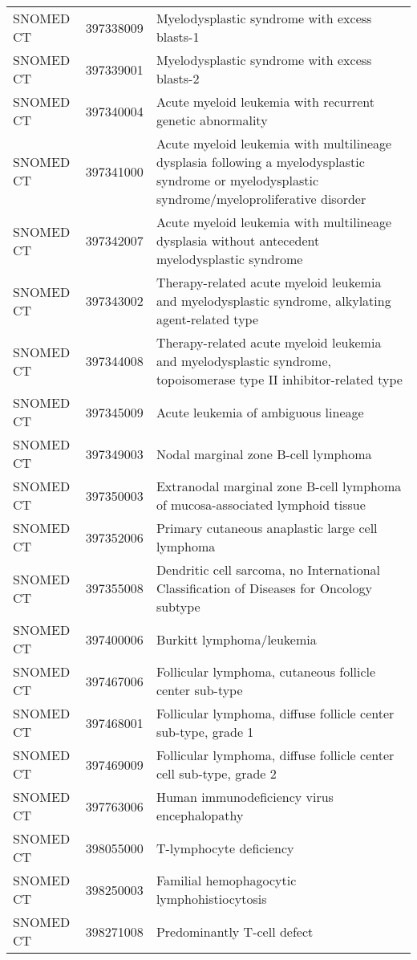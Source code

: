 \begin{table}[ht]
\begin{tabular}{lll}
  SNOMED CT & 397338009 & Myelodysplastic syndrome with excess blasts-1 \\ 
  SNOMED CT & 397339001 & Myelodysplastic syndrome with excess blasts-2 \\ 
  SNOMED CT & 397340004 & Acute myeloid leukemia with recurrent genetic abnormality \\ 
  SNOMED CT & 397341000 & Acute myeloid leukemia with multilineage dysplasia following a myelodysplastic syndrome or myelodysplastic syndrome/myeloproliferative disorder \\ 
  SNOMED CT & 397342007 & Acute myeloid leukemia with multilineage dysplasia without antecedent myelodysplastic syndrome \\ 
  SNOMED CT & 397343002 & Therapy-related acute myeloid leukemia and myelodysplastic syndrome, alkylating agent-related type \\ 
  SNOMED CT & 397344008 & Therapy-related acute myeloid leukemia and myelodysplastic syndrome, topoisomerase type II inhibitor-related type \\ 
  SNOMED CT & 397345009 & Acute leukemia of ambiguous lineage \\ 
  SNOMED CT & 397349003 & Nodal marginal zone B-cell lymphoma \\ 
  SNOMED CT & 397350003 & Extranodal marginal zone B-cell lymphoma of mucosa-associated lymphoid tissue \\ 
  SNOMED CT & 397352006 & Primary cutaneous anaplastic large cell lymphoma \\ 
  SNOMED CT & 397355008 & Dendritic cell sarcoma, no International Classification of Diseases for Oncology subtype \\ 
  SNOMED CT & 397400006 & Burkitt lymphoma/leukemia \\ 
  SNOMED CT & 397467006 & Follicular lymphoma, cutaneous follicle center sub-type \\ 
  SNOMED CT & 397468001 & Follicular lymphoma, diffuse follicle center sub-type, grade 1 \\ 
  SNOMED CT & 397469009 & Follicular lymphoma, diffuse follicle center cell sub-type, grade 2 \\ 
  SNOMED CT & 397763006 & Human immunodeficiency virus encephalopathy \\ 
  SNOMED CT & 398055000 & T-lymphocyte deficiency \\ 
  SNOMED CT & 398250003 & Familial hemophagocytic lymphohistiocytosis \\ 
  SNOMED CT & 398271008 & Predominantly T-cell defect \\ 

\end{tabular}
\end{table}
